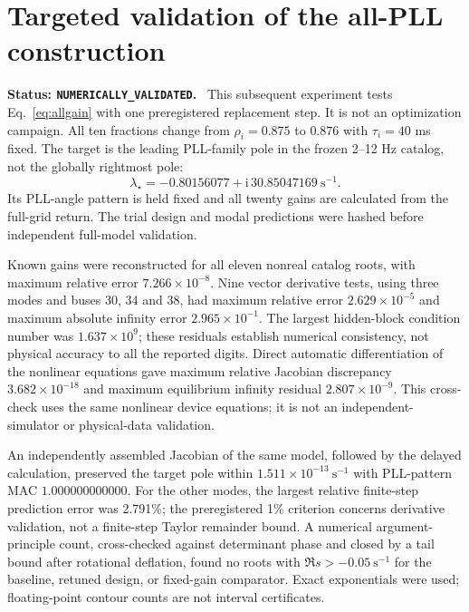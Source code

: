 \documentclass[11pt]{article}
\newcommand{\ii}{\mathrm{i}}
\newcommand{\status}[1]{\par\smallskip\noindent\textbf{Status: \texttt{#1}.}\ }
\begin{document}
\section{Targeted validation of the all-PLL construction}\label{sec:mapvalidation}
\status{NUMERICALLY\_VALIDATED}
This subsequent experiment tests Eq.~\eqref{eq:allgain} with one
preregistered replacement step. It is not an optimization campaign.
All ten fractions change from $\rho_i=0.875$ to $0.876$ with
$\tau_i=40$ ms fixed. The target is the leading PLL-family pole
in the frozen 2--12 Hz catalog, not the globally rightmost pole:
\[
 \lambda_\star=-0.80156077+\ii\,30.85047169\ \mathrm{s}^{-1}.
\]
Its PLL-angle pattern is held fixed and all twenty gains are calculated
from the full-grid return. The trial design and modal predictions
were hashed before independent full-model validation.

Known gains were reconstructed for all eleven nonreal catalog roots,
with maximum relative error $7.266\times10^{-8}$. Nine vector derivative tests,
using three modes and buses 30, 34 and 38, had maximum relative error
$2.629\times10^{-5}$ and maximum absolute infinity error $2.965\times10^{-1}$.
The largest hidden-block condition number was $1.637\times10^{9}$;
these residuals establish numerical consistency, not physical accuracy
to all the reported digits.
Direct automatic differentiation of the nonlinear equations gave
maximum relative Jacobian discrepancy $3.682\times10^{-18}$ and maximum equilibrium
infinity residual $2.807\times10^{-9}$. This cross-check uses the same
nonlinear device equations; it is not an independent-simulator or
physical-data validation.

An independently assembled Jacobian of the same model, followed by the delayed calculation, preserved the target
pole within $1.511\times10^{-13}\ \mathrm{s}^{-1}$ with PLL-pattern MAC $1.000000000000$.
For the other modes, the largest relative finite-step prediction error
was 2.791\%; the preregistered 1\% criterion concerns derivative
validation, not a finite-step Taylor remainder bound.
A numerical argument-principle count, cross-checked against determinant
phase and closed by a tail bound after rotational deflation, found no
roots with $\Re s>-0.05\ \mathrm{s}^{-1}$ for the baseline, retuned
design, or fixed-gain comparator. Exact exponentials were used;
floating-point contour counts are not interval certificates.
\end{document}

